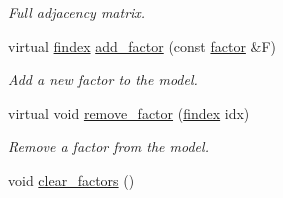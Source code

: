 \begin{DoxyCompactItemize}
\begin{DoxyCompactList}\small\item\em Full adjacency matrix. \end{DoxyCompactList}\item 
virtual \hyperlink{classmerlin_1_1graphical__model_ab2b46f09d8142bb68f243ecadbdabb6b}{findex} \hyperlink{classmerlin_1_1graphical__model_a7edaca0ce3ddea09f64e6bab406bfab8}{add\+\_\+factor} (const \hyperlink{classmerlin_1_1factor}{factor} \&F)
\begin{DoxyCompactList}\small\item\em Add a new factor to the model. \end{DoxyCompactList}\item 
virtual void \hyperlink{classmerlin_1_1graphical__model_aabcdb025068a429bc1ab8d62e38065d9}{remove\+\_\+factor} (\hyperlink{classmerlin_1_1graphical__model_ab2b46f09d8142bb68f243ecadbdabb6b}{findex} idx)
\begin{DoxyCompactList}\small\item\em Remove a factor from the model. \end{DoxyCompactList}\item 
void \hyperlink{classmerlin_1_1graphical__model_a01c2f86dfbe20a3f0c8b4b057c9ef61a}{clear\+\_\+factors} ()\hypertarget{classmerlin_1_1graphical__model_a01c2f86dfbe20a3f0c8b4b057c9ef61a}{}\label{classmerlin_1_1graphical__model_a01c2f86dfbe20a3f0c8b4b057c9ef61a}


\end{DoxyCompactItemize}
